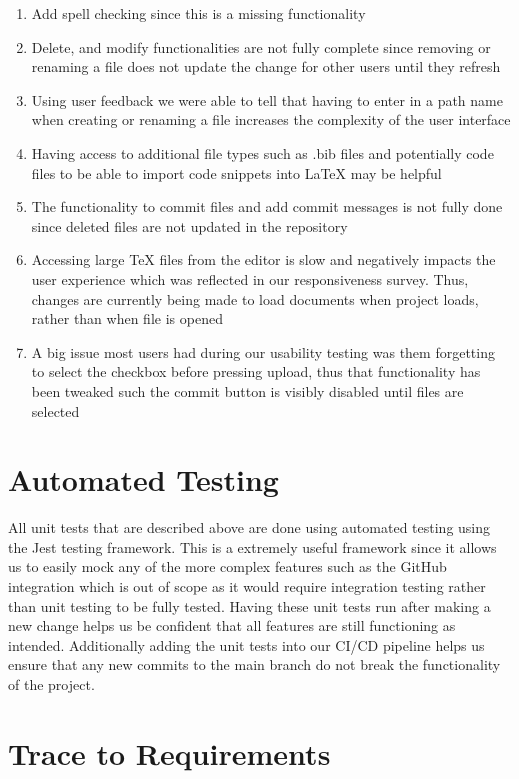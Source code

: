 \documentclass[12pt, titlepage]{article}
\begin{document}
\begin{enumerate}
    \item Add spell checking since this is a missing functionality\
    \item Delete, and modify functionalities are not fully complete since removing or renaming a file does not update the change for other users until they refresh
    \item Using user feedback we were able to tell that having to enter in a path name when creating or renaming a file increases the complexity of the user interface
    \item Having access to additional file types such as .bib files and potentially code files to be able to import code snippets into LaTeX may be helpful
    \item The functionality to commit files and add commit messages is not fully done since deleted files are not updated in the repository
    \item Accessing large TeX files from the editor is slow and negatively impacts the user experience which was reflected in our responsiveness survey. Thus, changes are currently being made to load documents when project loads, rather than when file is opened
    \item A big issue most users had during our usability testing was them forgetting to select the checkbox before pressing upload, thus that functionality has been tweaked such the commit button is visibly disabled until files are selected
\end{enumerate}

\section{Automated Testing}

All unit tests that are described above are done using automated testing using the Jest testing framework. This is a extremely useful framework since it allows us to easily mock any of the more complex features such as the GitHub integration which is out of scope as it would require integration testing rather than unit testing to be fully tested. Having these unit tests run after making a new change helps us be confident that all features are still functioning as intended. Additionally adding the unit tests into our CI/CD pipeline helps us ensure that any new commits to the main branch do not break the functionality of the project.

\newpage

\section{Trace to Requirements}
\end{document}
